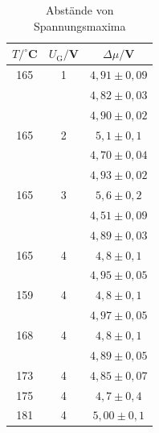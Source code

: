 \begin{table}[h]
    \centering
    \begin{tabular}{c c c}
      \toprule
      $T/^\circ$C & $U_\mathrm{G}/$V & $\Delta \mu/$V\\
      \midrule
      165&1&$4,91\pm 0,09$\\
      &&$4,82\pm 0,03$\\
      &&$4,90 \pm 0,02$\\
      165&2&$5,1 \pm 0,1$\\
      &&$4,70 \pm 0,04$\\
      &&$4,93 \pm 0,02$\\
      165&3&$5,6 \pm 0,2$\\
      &&$4,51 \pm 0,09$\\
      &&$4,89 \pm 0,03$\\
      165&4&$4,8 \pm 0,1$\\
      &&$4,95 \pm 0,05$\\
      159&4&$4,8 \pm 0,1$\\
      &&$4,97 \pm 0,05$\\
      168&4&$4,8 \pm 0,1$\\
      &&$4,89 \pm 0,05$\\
      173&4&$4,85 \pm 0,07$\\
      175&4&$4,7 \pm 0,4$\\
      181&4&$5,00\pm 0,1$\\
      \bottomrule
    \end{tabular}
    \caption{Abstände von Spannungsmaxima}
    \label{tab:fh_dist}
  \end{table}
